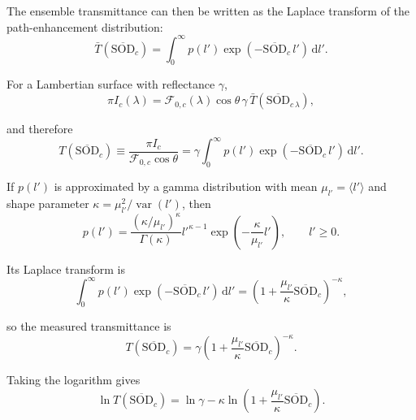 The ensemble transmittance can then be written as the Laplace transform of
the path-enhancement distribution:
\begin{equation}
\bar{T}(\overline{\mathrm{SOD}}_c)
=
\int_0^\infty
p(l')
\exp(-\overline{\mathrm{SOD}}_c \, l')
\,\mathrm{d}l' .
\label{eq:path_enhancement_laplace}
\end{equation}


For a Lambertian surface with reflectance $\gamma$,
\begin{equation}
\pi I_c(\lambda)
=
\mathcal{F}_{0,c}(\lambda)\cos\theta\,
\gamma\,
\bar{T}(\overline{\mathrm{SOD}}_{c \, \lambda}),
\label{eq:radiance_lambertian}
\end{equation}



and therefore
\begin{equation}
T(\overline{\mathrm{SOD}}_c)
\equiv
\frac{\pi I_c}{\mathcal{F}_{0,c}\cos\theta}
=
\gamma
\int_0^\infty
p(l')
\exp(-\overline{\mathrm{SOD}}_c \, l')
\,\mathrm{d}l' .
\label{eq:measured_laplace_appendix}
\end{equation}



If $p(l')$ is approximated by a gamma distribution with mean
$\mu_{l'}=\langle l'\rangle$ and shape parameter
$\kappa=\mu_{l'}^2/\operatorname{var}(l')$, then
\begin{equation}
p(l')
=
\frac{(\kappa/\mu_{l'})^{\kappa}}{\Gamma(\kappa)}
l'^{\kappa-1}
\exp\left(-\frac{\kappa}{\mu_{l'}}l'\right),
\qquad
l' \ge 0 .
\label{eq:gamma_path_distribution}
\end{equation}



Its Laplace transform is
\begin{equation}
\int_0^\infty
p(l')\exp(-\overline{\mathrm{SOD}}_c \, l')
\,\mathrm{d}l'
=
\left(
1+\frac{\mu_{l'}}{\kappa}\overline{\mathrm{SOD}}_c
\right)^{-\kappa},
\label{eq:gamma_laplace_transform}
\end{equation}



so the measured transmittance is
\begin{equation}
T(\overline{\mathrm{SOD}}_c)
=
\gamma
\left(
1+\frac{\mu_{l'}}{\kappa}\overline{\mathrm{SOD}}_c
\right)^{-\kappa}.
\label{eq:gamma_transmittance}
\end{equation}



Taking the logarithm gives
\begin{equation}
\ln T(\overline{\mathrm{SOD}}_c)
=
\ln\gamma
-
\kappa
\ln\left(
1+\frac{\mu_{l'}}{\kappa}\overline{\mathrm{SOD}}_c
\right).
\label{eq:log_gamma_transmittance}
\end{equation}



